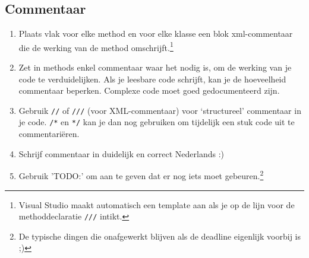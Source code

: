 \documentclass[a4paper,11pt]{article}
\begin{document}

\subsection{Commentaar}

\begin{enumerate}[resume]
\item Plaats vlak voor elke method en voor elke klasse een blok xml-commentaar die de werking van de method
omschrijft.\footnote{Visual Studio maakt automatisch een template aan als je op de lijn voor de
methoddeclaratie \lstinline !///! intikt.}
\item Zet in methods enkel commentaar waar het nodig is, om de werking van je code te
verduidelijken.  Als je leesbare code schrijft, kan je de hoeveelheid commentaar beperken.
Complexe code moet goed gedocumenteerd zijn.
\item Gebruik \lstinline !//! of \lstinline !///! (voor XML-commentaar) voor `structureel'
commentaar in je code.  \lstinline !/*! en \lstinline !*/! kan je dan nog gebruiken om tijdelijk
een stuk code uit te commentari\"eren.
\item Schrijf commentaar in duidelijk en correct Nederlands :)
\item Gebruik 'TODO:' om aan te geven dat er nog iets moet gebeuren.\footnote{De typische
dingen die onafgewerkt blijven als de deadline eigenlijk voorbij is ;)}
\end{enumerate}
\end{document}
